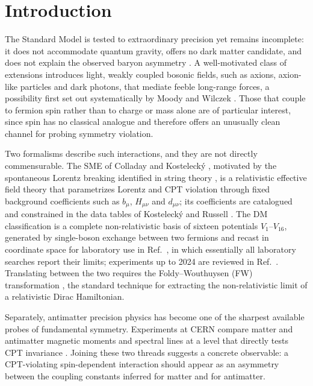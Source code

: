 \documentclass[
  aps,
  prd,
  reprint,
  amsmath,
  amssymb,
  nofootinbib,
  superscriptaddress,
  floatfix
]{revtex4-2}
\begin{document}
\maketitle

\section{Introduction}
\label{sec:intro}

The Standard Model is tested to extraordinary precision yet remains
incomplete: it does not accommodate quantum gravity, offers no dark matter
candidate, and does not explain the observed baryon asymmetry
\cite{Planck2018}. A well-motivated class of extensions introduces light,
weakly coupled bosonic fields, such as axions, axion-like particles and
dark photons, that mediate feeble long-range forces, a possibility first set
out systematically by Moody and Wilczek \cite{MoodyWilczek1984}. Those that couple to
fermion spin rather than to charge or mass alone are of particular
interest, since spin has no classical analogue and therefore offers an
unusually clean channel for probing symmetry violation.

Two formalisms describe such interactions, and they are not directly
commensurable. The SME of Colladay and Kostelecký
\cite{Colladay1997,Colladay1998}, motivated by the spontaneous Lorentz
breaking identified in string theory \cite{KosteleckySamuel1989}, is a
relativistic effective field theory
that parametrizes Lorentz and CPT violation through fixed background
coefficients such as $b_\mu$, $H_{\mu\nu}$ and $d_{\mu\nu}$; its
coefficients are catalogued and constrained in the data tables of
Kostelecký and Russell \cite{KosteleckyRussell2011}. The DM
classification \cite{Dobrescu2006} is a complete non-relativistic basis of
sixteen potentials $V_1$--$V_{16}$, generated by single-boson exchange
between two fermions and recast in coordinate space for laboratory use in
Ref.~\cite{Fadeev2019}, in which essentially all laboratory searches
report their limits; experiments up to 2024 are reviewed in
Ref.~\cite{Cong2025}. Translating between the two
requires the Foldy--Wouthuysen (FW) transformation \cite{Foldy1950}, the
standard technique for extracting the non-relativistic limit of a
relativistic Dirac Hamiltonian.

Separately, antimatter precision physics has become one of the sharpest
available probes of fundamental symmetry. Experiments at CERN compare
matter and antimatter magnetic moments and spectral lines at a level that
directly tests CPT invariance \cite{Smorra2017,Ahmadi2017}. Joining these
two threads suggests a concrete observable: a CPT-violating
spin-dependent interaction should appear as an asymmetry between the
coupling constants inferred for matter and for antimatter.
\end{document}
